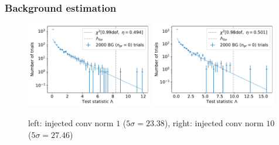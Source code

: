 \documentclass[aspectratio=1610, 9pt]{beamer}
\begin{document}
\begin{frame}
  \frametitle{Background estimation}
  \begin{figure}
    \centering
    \includegraphics[width=0.49\textwidth]{../Plots/background_distribution_fit_conv=1.pdf}
    \includegraphics[width=0.49\textwidth]{../Plots/background_distribution_fit_conv=10.pdf}
    \caption{left: injected conv norm $1$ ($5\sigma=23.38$), right: injected conv norm $10$ ($5\sigma=27.46$)}
  \end{figure}
\end{frame}
\end{document}
